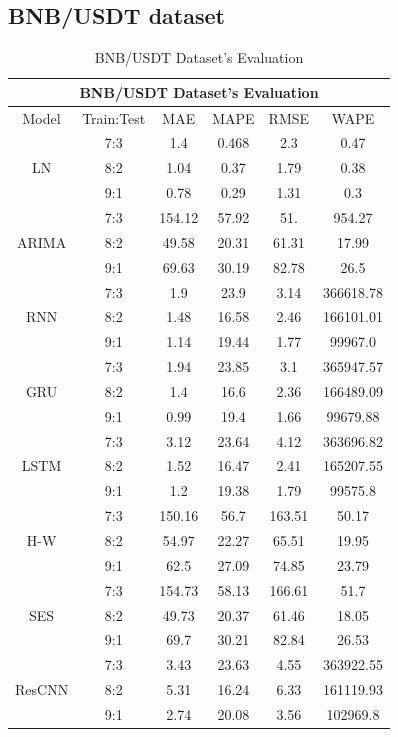 \documentclass{ieeeojies}
\begin{document}
\subsection{BNB/USDT dataset}
\begin{table}[H]
    \centering
    \begin{tabular}{|c|c|c|c|c|c|}
         \hline
         \multicolumn{6}{|c|}{\textbf{BNB/USDT Dataset's Evaluation}}\\
         \hline
         \centering Model & Train:Test & MAE & MAPE & RMSE & WAPE \\ 
         \hline
         \multirow{3}{*}{LN} & 7:3 & 1.4 & 0.468 & 2.3 & 0.47 \\ & 8:2 & 1.04 & 0.37 & 1.79 & 0.38 \\ & 9:1 & 0.78 & 0.29 & 1.31 & 0.3 \\ 
         \hline
         \multirow{3}{*}{ARIMA} & 7:3 & 154.12 & 57.92 & 51. & 954.27 \\ & 8:2 & 49.58 & 20.31 & 61.31 & 17.99 \\ & 9:1 & 69.63 & 30.19 & 82.78 & 26.5 \\
         \hline
         \multirow{3}{*}{RNN} & 7:3 & 1.9 & 23.9 & 3.14 & 366618.78 \\ & 8:2 & 1.48 & 16.58 & 2.46 & 166101.01 \\ & 9:1 & 1.14 & 19.44 & 1.77 & 99967.0 \\
         \hline
         \multirow{3}{*}{GRU} & 7:3 & 1.94 & 23.85 & 3.1 & 365947.57 \\ & 8:2 & 1.4 & 16.6 & 2.36 & 166489.09 \\ & 9:1 & 0.99 & 19.4 & 1.66 & 99679.88 \\
         \hline
         \multirow{3}{*}{LSTM} & 7:3 & 3.12 & 23.64 & 4.12 & 363696.82 \\ & 8:2 & 1.52 & 16.47 & 2.41 & 165207.55 \\ & 9:1 & 1.2 & 19.38 & 1.79 & 99575.8 \\
         \hline
         \multirow{3}{*}{H-W} & 7:3 & 150.16 & 56.7 & 163.51 & 50.17 \\ & 8:2 & 54.97 & 22.27 & 65.51 & 19.95 \\ & 9:1 & 62.5 & 27.09 & 74.85 & 23.79 \\
         \hline
         \multirow{3}{*}{SES} & 7:3 & 154.73 & 58.13 & 166.61 & 51.7 \\ & 8:2 & 49.73 & 20.37 & 61.46 & 18.05 \\ & 9:1 & 69.7 & 30.21 & 82.84 & 26.53 \\
         \hline
         \multirow{3}{*}{ResCNN} & 7:3 & 3.43 & 23.63 & 4.55 & 363922.55 \\ & 8:2 & 5.31 & 16.24 & 6.33 & 161119.93 \\ & 9:1 & 2.74 & 20.08 & 3.56 & 102969.8 \\
         \hline
    \end{tabular}
    \caption{BNB/USDT Dataset's Evaluation}
    \label{bnbresult}
\end{table}
\end{document}
